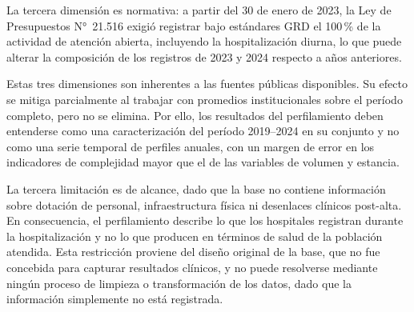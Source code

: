 La tercera dimensión es normativa: a partir del 30 de enero de 2023, la Ley de
Presupuestos N°~21.516 exigió registrar bajo estándares GRD el 100\,\% de la
actividad de atención abierta, incluyendo la hospitalización diurna, lo que puede
alterar la composición de los registros de 2023 y 2024 respecto a años anteriores.

Estas tres dimensiones son inherentes a las fuentes públicas disponibles. Su
efecto se mitiga parcialmente al trabajar con promedios institucionales sobre el
período completo, pero no se elimina. Por ello, los resultados del perfilamiento
deben entenderse como una caracterización del período 2019--2024 en su conjunto y
no como una serie temporal de perfiles anuales, con un margen de error en los
indicadores de complejidad mayor que el de las variables de volumen y estancia.

La tercera limitación es de alcance, dado que la base no contiene información sobre
dotación de personal, infraestructura física ni desenlaces clínicos post-alta.
En consecuencia, el perfilamiento describe lo que los hospitales registran durante
la hospitalización y no lo que producen en términos de salud de la población
atendida. Esta restricción proviene del diseño original de la base, que no fue concebida
para capturar resultados clínicos, y no puede resolverse mediante ningún proceso
de limpieza o transformación de los datos, dado que la información simplemente no
está registrada.

